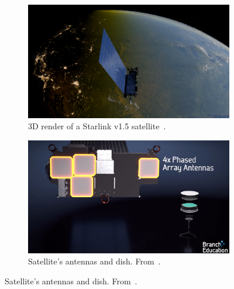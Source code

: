 \documentclass{article}
\begin{document}
\begin{figure}[h!]
    \centering

    \begin{subfigure}[b]{0.49\textwidth}
        \centering
        \includegraphics[width=\textwidth]{LaTeX/Figures/satellite_render.png}
        \caption{3D render of a Starlink v1.5 satellite~\cite{wikimedia_starlink_01_2025}.}
        \label{fig:satellite_render}
    \end{subfigure}\hfill %
    \begin{subfigure}[b]{0.49\textwidth}
        \centering
        \includegraphics[width=\textwidth]{LaTeX/Figures/satellite_antennas.png}
        \caption{Satellite's antennas and dish. From~\cite{branch_education_starlink_2022}.}
        \label{fig:satellite_antennas}
    \end{subfigure}
    
\end{figure}
\end{document}
